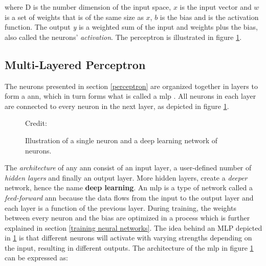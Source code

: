         where D is the number dimension of the input space, $x$ is the input vector and $w$ is a set of weights that is of the same size as $x$, $b$ is the bias and {\textsigma} is the activation function. The output \textit{y} is a weighted sum of the input and weights plus the bias, also called the neurons' \textit{activation}. The perceptron is illustrated in figure \ref{Perceptron / MLP}.
    
    \subsection{Multi-Layered Perceptron} \label{MLP}
        The neurons presented in section \ref{perceptron} are organized together in layers to form a \gls{ann}, which in turn forms what is called a \gls{mlp} \cite{razavi2021deep_exp_per}. All neurons in each layer are connected to every neuron in the next layer, as depicted in figure \ref{Perceptron / MLP}.
        
            \begin{figure}[H]
                \centering
                
        	
                
                \caption[The perceptron and multi-layer perceptron]{Illustration of a single neuron and a deep learning network of neurons.}
              	\medskip 
                \hspace*{15pt}\hbox{\scriptsize Credit: \citeauthor{razavi2021deep_exp_DL}\cite{razavi2021deep_exp_DL}}
                \label{Perceptron / MLP}
            \end{figure}
        
        The \textit{architecture} of any \gls{ann} consist of an input layer, a user-defined number of \textit{hidden layers} and finally an output layer\cite{razavi2021deep_exp_per}. More hidden layers, create a \textit{deeper} network, hence the name \textbf{deep learning}. An \gls{mlp} is a type of network called a \textit{feed-forward} \gls{ann} because the data flows from the input to the output layer and each layer is a function of the previous layer. During training, the weights between every neuron and the bias are optimized in a process which is further explained in section \ref{training neural networks}. The idea behind an MLP depicted in \ref{Perceptron / MLP} is that different neurons will activate with varying strengths depending on the input, resulting in different outputs. The architecture of the \gls{mlp} in figure \ref{Perceptron / MLP} can be expressed as\cite{Goodfellow-et-al-2016_architecture}:
        
